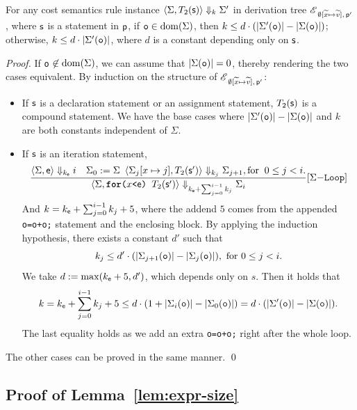\documentclass[runningheads]{llncs}
\begin{document}
\begin{claim}
    For any cost semantics rule instance $\cost{\Sigma}{T_2(\s)}{\Sigma'}{k}$ in derivation tree $\evalTree{\emptyset[\widetilde{x}\mapsto\widetilde{v}]}{\p'}$, where $\s$ is a statement in $\p$,  if $\texttt{o}\in\dom(\Sigma)$, then $k \le d \cdot (\size{\Sigma'(\texttt{o})}-\size{\Sigma(\texttt{o})})$; otherwise, $k \le d \cdot \size{\Sigma'(\texttt{o})}$, where $d$ is a constant depending only on $\s$.
\end{claim}

\begin{proof}
If \texttt{o} $\not\in\dom(\Sigma)$, we can assume that $\size{\Sigma(\texttt{o})} = 0$, thereby rendering the two cases equivalent.
By induction on the structure of $\evalTree{\emptyset[\widetilde{x}\mapsto\widetilde{v}]}{\p'}$:
\begin{itemize}
    \item If $\s$ is a declaration statement or an assignment statement, $T_2(\s)$ is a compound statement. We have the base cases where $\size{\Sigma'(\texttt{o})}-\size{\Sigma(\texttt{o})}$ and $k$ are both constants independent of $\Sigma$.
    \item If $\s$ is an iteration statement,
    \[
    \srule{\cost{\Sigma}{\e}{i}{k_\e}\quad\Sigma_0:=\Sigma\enspace\cost{\Sigma_{j}[x\mapsto j]}{T_2(\s')}{\Sigma_{j+1}}{k_j},\text{for}\;\;0\le j< i.}{\cost{\Sigma}{\texttt{\textbf{for}(}x \texttt{<} \e \texttt{) } T_2(\s')}{\Sigma_{i}}{k_\e+\sum_{j=0}^{i-1}k_j}}{Loop}
    \]
    And $k = k_\e+\sum_{j=0}^{i-1}k_j + 5$, where the addend $5$ comes from the appended \texttt{o=o+o;} statement and the enclosing block.
    By applying the induction hypothesis, there exists a constant $d'$ such that
    \begin{equation}
        k_j\le d' \cdot (\size{\Sigma_{j+1}(\texttt{o})}-\size{\Sigma_{j}(\texttt{o})}),\text{ for }0\le j<i.
    \end{equation}
    We take $d := \max (k_\e + 5, d')$, which depends only on $s$. 
    Then it holds that
    $$k = k_\e + \sum_{j=0}^{i-1}k_j + 5 \le d \cdot (1 + \size{\Sigma_{i}(\texttt{o})}-\size{\Sigma_{0}(\texttt{o})}) = d \cdot (\size{\Sigma'(\texttt{o})}-\size{\Sigma(\texttt{o})}).$$
    The last equality holds as we add an extra \texttt{o=o+o;} right after the whole loop.
\end{itemize}
The other cases can be proved in the same manner.
\qed
\end{proof}

\subsection{Proof of Lemma~\ref{lem:expr-size}}\label{App_proof_of_lemma:expr-size}
\end{document}
